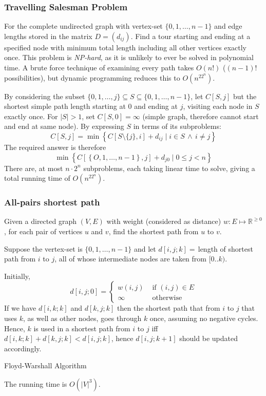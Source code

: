\documentclass[10pt]{article}
\begin{document}
\subsubsection{Travelling Salesman Problem}
For the complete undirected graph with vertex-set $\{0,1,\ldots,n-1\}$ and edge lengths stored in the matrix $D=\left(d_{ij}\right)$.
Find a tour starting and ending at a specified node with minimum total length including all other vertices exactly once.
This problem is \emph{NP-hard}, as it is unlikely to ever be solved in polynomial time.  A brute force technique of examining every path takes $O(n!)$ ($(n-1)!$ possibilities), but dynamic programming reduces this to $O(n^22^n)$.

By considering the subset $\{0,1,\ldots,j\}\subseteq S\subseteq \{0,1,\ldots,n-1\}$, let $C[S,j]$ but the shortest simple path length starting at 0 and ending at $j$, visiting each node in $S$ exactly once.  For $|S|>1$, set $C[S,0]=\infty$ (simple graph, therefore cannot start and end at same node).  By expressing $S$ in terms of its subproblems: \[C[S,j]=\min\left\{C[S\setminus\{j\},i]+d_{ij}\mid i\in S\,\wedge\, i\neq j\right\}\]
The required answer is therefore \[\min\left\{C\left[\left\{O,1,\ldots,n-1\right\},j\right]+d_{j0}\mid 0\le j < n\right\}\]
There are, at most $n\cdot 2^n$ subproblems, each taking linear time to solve, giving a total running time of $O\left(n^22^n\right)$.
\subsubsection{All-pairs shortest path}
Given a directed graph $(V,E)$ with weight (considered as distance) $w:E\mapsto \mathbb{R}^{\ge0}$, for each pair of vertices $u$ and $v$, find the shortest path from $u$ to $v$.

Suppose the vertex-set is $\{0,1,\ldots,n-1\}$ and let $d[i,j;k]=\,$length of shortest path from $i$ to $j$, all of whose intermediate nodes are taken from $[0..k)$.

Initially, \[d[i,j;0]=\begin{cases}w(i,j)&\text{ if }(i,j)\in E\\\infty&\text{ otherwise}\end{cases}\]
If we have $d[i,k;k]$ and $d[k,j;k]$ then the shortest path that from $i$ to $j$ that uses $k$, as well as other nodes, goes through $k$ once, assuming no negative cycles.  Hence, $k$ is used in a shortest path from $i$ to $j$ iff $d[i,k;k]+d[k,j;k]<d[i,j;k]$, hence $d[i,j;k+1]$ should be updated accordingly.
\begin{algorithm}
\caption{Floyd-Warshall Algorithm}

\;
\end{algorithm}
The running time is $O\left(|V|^3\right)$.
\end{document}
